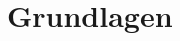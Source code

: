 


\newcommand{\SUBJECT}{Zusammenfassung}
\newcommand{\TITLE}{Analysis für Informatiker 2}



\section{Grundlagen}
